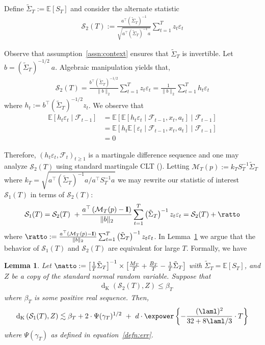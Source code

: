 \documentclass[11pt,letterpaper]{article}
\newcommand{\Exs}{\mathbb{E}}
\newcommand{\Id}{\mathbf{I}}
\newcommand{\z}{z}
\newcommand{\dist}{\operatorname{d}_{\operatorname{K}}}
\newcommand{\err}{\Psi(\gamma_T)}
\newcommand{\PT}{\tilde{\Sigma}_T}
\newcommand{\fil}{\mathcal{F}}
\newcommand{\SigPinv}{ \left(\PT \right)^{-1}}
\newcommand{\mtp}{S_T^{-1} \PT}
\newcommand{\stao}{\mathcal{S}_1(T)}
\newcommand{\stato}{\mathcal{S}_2(T)}
\newcommand{\MTP}{\mathcal{M}_T(p)}
\theoremstyle{plain}
\newtheorem{lemma}{Lemma}
\theoremstyle{definition}  %
\begin{document}
\noindent Define $\PT := \Exs[S_T]$ and consider the alternate statistic
\begin{align}\label{defn:stato}
    \stato := \frac{a^{\top} (\PT)^{-1}}{ \sqrt{ a^{\top} (\PT)^{-1} a}} \sum^T_{t=1} \z_t  \varepsilon_t
\end{align}

\noindent Observe that assumption~\ref{assn:context} ensures that $\PT$ is invertible. Let $b = (\PT)^{-1/2} \ a$. Algebraic manipulation yields that,
\begin{align*}
    \stato
   = \frac{b^{\top} (\PT)^{-1/2}}{ \|b \|_2} \sum^T_{t=1} \z_t  \varepsilon_t 
    = \frac{1}{ \|b \|_2} \sum^T_{t=1} h_t  \varepsilon_t
\end{align*}
where $h_t := b^{\top} (\PT)^{-1/2} \z_t$. We observe that
\begin{align*}
    \Exs[h_t\varepsilon_t \mid \fil_{t-1}]
    &=  \Exs[ \Exs[ h_t\varepsilon_t \mid \fil_{t-1},x_t,a_t] \mid \fil_{t-1}]\\[8pt]
    & = \Exs[h_t \Exs[ \varepsilon_t \mid \fil_{t-1},x_t,a_t] \mid \fil_{t-1}]\\[8pt]
    & = 0
\end{align*}


\noindent Therefore, $(h_t\varepsilon_t,\fil_t)_{t\geq 1}$ is a martingale difference sequence and one may analyze $\stato$ using standard martingale CLT (\citet{mourrat2013rate}).  Letting  $\MTP := k_T \mtp$ where $k_T = \sqrt{ a^{\top} \SigPinv a / a^{\top} S_T^{-1} a}$ we may rewrite our statistic of interest $\stao$ in terms of $\stato$:
\begin{align}
    \stao = \stato \ + \frac{a^{\top} \left(\MTP-\Id  \right)}{ \| b\|_2} \sum^T_{t=1} \SigPinv\z_t  \varepsilon_t 
    = \stato + \ratto
\end{align}
where $\ratto :=  \frac{a^{\top} \left(\MTP-\Id  \right)}{ \| b\|_2} \sum^T_{t=1} \SigPinv\z_t  \varepsilon_t $. 
In Lemma~\ref{lemma:stato-genbdd} we argue that the behavior of $\stao$ and $\stato$ are equivalent for large $T$.  Formally, we have 
\begin{lemma}\label{lemma:stato-genbdd}
   Let $\natto :=\left[\frac{1}{T} \PT \right]^{-1} \times \left[ \frac{M_T}{T} + \frac{B_T}{T}-\frac{1}{T} \PT\right]$ with $\PT = \Exs [S_T]$, and $Z$ be a copy of the standard normal random variable. Suppose that 
\begin{align}\label{eqn:assn-stato}
    \quad \dist \left(\stato, Z \right) \leq \beta_T
\end{align}
where $\beta_T$ is some positive real sequence. Then,
\begin{align}\label{eqn:stao-general-bdd}
    \dist \left(\stao, Z \right) \lesssim \beta_T + 2 \cdot \err^{1/2} \ + \  d \cdot \expower\left\{ - \frac{(\laml)^2}{32 +  8\laml/3} \cdot  T\right\}
\end{align}
where $\err$ as defined in equation~\eqref{defn:err}.
\end{lemma}
\end{document}
